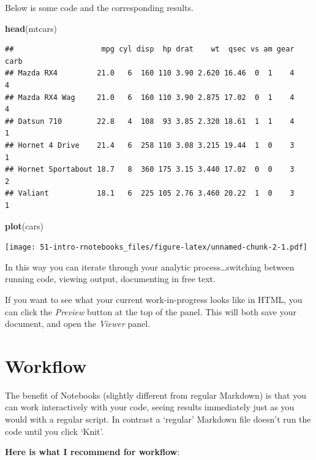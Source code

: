 \documentclass[
]{book}
\newenvironment{Shaded}{\begin{snugshade}}{\end{snugshade}}
\newcommand{\FunctionTok}[1]{\textcolor[rgb]{0.13,0.29,0.53}{\textbf{#1}}}
\newcommand{\NormalTok}[1]{#1}
\begin{document}
Below is some code and the corresponding results.

\begin{Shaded}
\begin{Highlighting}[]
\FunctionTok{head}\NormalTok{(mtcars)}
\end{Highlighting}
\end{Shaded}

\begin{verbatim}
##                    mpg cyl disp  hp drat    wt  qsec vs am gear carb
## Mazda RX4         21.0   6  160 110 3.90 2.620 16.46  0  1    4    4
## Mazda RX4 Wag     21.0   6  160 110 3.90 2.875 17.02  0  1    4    4
## Datsun 710        22.8   4  108  93 3.85 2.320 18.61  1  1    4    1
## Hornet 4 Drive    21.4   6  258 110 3.08 3.215 19.44  1  0    3    1
## Hornet Sportabout 18.7   8  360 175 3.15 3.440 17.02  0  0    3    2
## Valiant           18.1   6  225 105 2.76 3.460 20.22  1  0    3    1
\end{verbatim}

\begin{Shaded}
\begin{Highlighting}[]
\FunctionTok{plot}\NormalTok{(cars)}
\end{Highlighting}
\end{Shaded}

\texttt{[image: 51-intro-rnotebooks\_files/figure-latex/unnamed-chunk-2-1.pdf]}

In this way you can iterate through your analytic process\ldots switching between running code, viewing output, documenting in free text.

If you want to see what your current work-in-progress looks like in HTML, you can click the \emph{Preview} button at the top of the panel. This will both save your document, and open the \emph{Viewer} panel.

\hypertarget{workflow}{%
\section{Workflow}\label{workflow}}

The benefit of Notebooks (slightly different from regular Markdown) is that you can work interactively with your code, seeing results immediately just as you would with a regular script. In contrast a `regular' Markdown file doesn't run the code until you click `Knit'.

\textbf{Here is what I recommend for workflow}:
\end{document}
